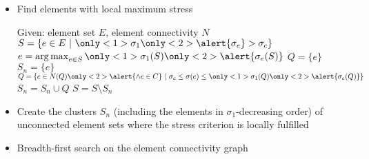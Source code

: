 \documentclass[aspectratio=169]{beamer}
\DeclareMathOperator*{\argmax}{arg\,max}
\newcommand{\st}{\ |\ } %
\begin{document}
\begin{frame}
        \frametitle{\insertsubsection}
       \begin{itemize}
           \setlength\itemsep{0em}
           \item {} 
           \vspace{-3mm}
           \begin{algorithm}[H]
               \caption{Find elements with local maximum stress}
               \footnotesize{
               \begin{algorithmic}[1]
                   \State Given: element set $E$, element connectivity $N$
                   \State $S = \{e\in E \st \only<1>{\sigma_1} \only<2>{\alert{\sigma_e}} > \sigma_c \}$ 
                    
                      \State $e = \argmax_{e\in S}\only<1>{\sigma_1(S)}\only<2>{\alert{\sigma_e(S)}}$ 
                      \State $Q = \{ e \}$ 
                      \State $S_n = \{ e \}$ 
                       
                         \State $Q = \{ e\in N(Q) \only<2>{\alert{\wedge e\in C}}\st \sigma_c \leq \sigma(e) \leq \only<1>{\sigma_1(Q)} \only<2>{\alert{\sigma_e(Q)}} \}$ 
                         \State $S_n = S_n \cup Q$ 
                      \EndWhile
                         \State $S = S \setminus S_n$ 
                   \EndWhile
               \end{algorithmic}
               }
               \label{alg:stressCriterion}
           \end{algorithm}
       \vspace{-3mm}
       \item \footnotesize{Create the clusters $S_n$ (including the elements in $\sigma_1$-decreasing order) of unconnected element sets where the stress criterion is locally fulfilled}
       \item \footnotesize{Breadth-first search on the element connectivity graph}
       \end{itemize}
    \end{frame}
\end{document}
